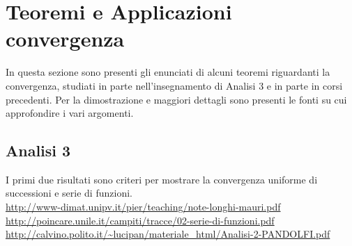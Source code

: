 \documentclass[12pt,a4paper]{report}
\begin{document}
\section*{Teoremi e Applicazioni convergenza}
In questa sezione sono presenti gli enunciati di alcuni teoremi riguardanti la convergenza, studiati in parte nell'insegnamento di Analisi 3 e in parte in corsi precedenti. Per la dimostrazione e maggiori dettagli sono presenti le fonti su cui approfondire i vari argomenti.

\subsection*{Analisi 3}
I primi due risultati sono criteri per mostrare la convergenza uniforme di successioni e serie di funzioni.\\
\url{http://www-dimat.unipv.it/pier/teaching/note-longhi-mauri.pdf}\\
\url{http://poincare.unile.it/campiti/tracce/02-serie-di-funzioni.pdf}\\
\url{http://calvino.polito.it/~lucipan/materiale_html/Analisi-2-PANDOLFI.pdf}
\end{document}
